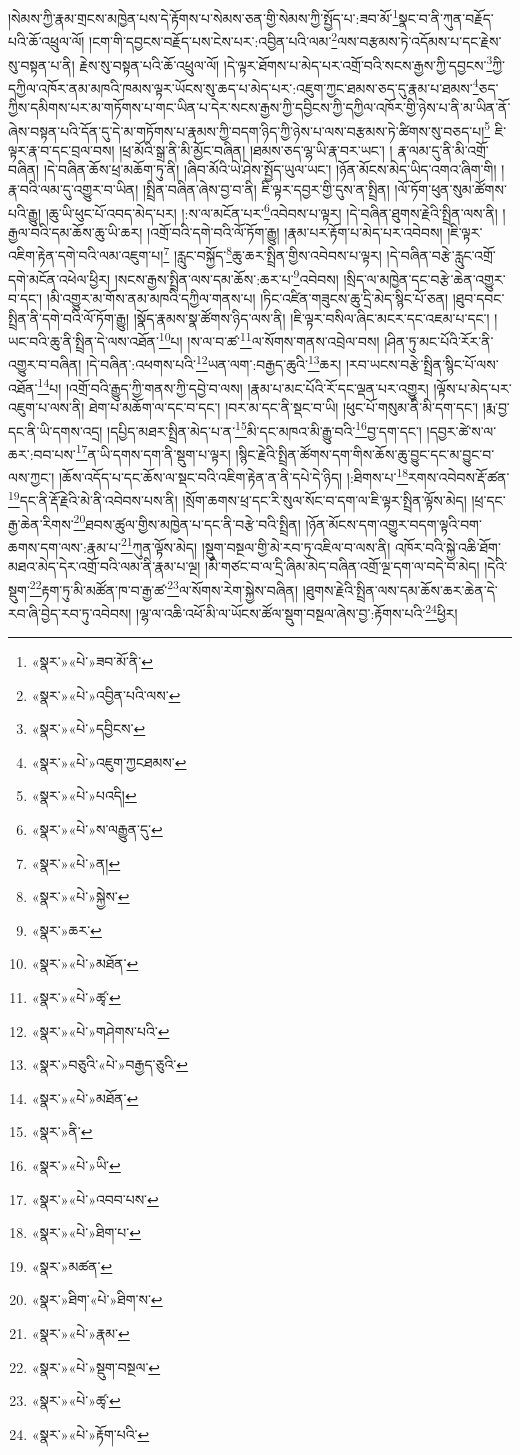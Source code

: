།སེམས་ཀྱི་རྣམ་གྲངས་མཁྱེན་པས་དེ་རྟོགས་པ་སེམས་ཅན་གྱི་སེམས་ཀྱི་སྤྱོད་པ་:ཟབ་མོ་\footnote{«སྣར་»«པེ་»ཟབ་མོ་ནི་}སྣང་བ་ནི་ཀུན་བརྗོད་པའི་ཆོ་འཕྲུལ་ལོ། །ངག་གི་དབྱངས་བརྗོད་པས་ངེས་པར་:འབྱིན་པའི་ལམ་\footnote{«སྣར་»«པེ་»འབྱིན་པའི་ལས་}ལས་བརྩམས་ཏེ་འདོམས་པ་དང་རྗེས་སུ་བསྟན་པ་ནི། རྗེས་སུ་བསྟན་པའི་ཆོ་འཕྲུལ་ལོ། །དེ་ལྟར་ཐོགས་པ་མེད་པར་འགྲོ་བའི་སངས་རྒྱས་ཀྱི་དབྱངས་\footnote{«སྣར་»«པེ་»དབྱིངས་}ཀྱི་དཀྱིལ་འཁོར་ནམ་མཁའི་ཁམས་ལྟར་ཡོངས་སུ་ཆད་པ་མེད་པར་:འཇུག་ཀྱང་ཐམས་ཅད་དུ་རྣམ་པ་ཐམས་\footnote{«སྣར་»«པེ་»འཇུག་ཀྱངཐམས་}ཅད་ཀྱིས་དམིགས་པར་མ་གཏོགས་པ་གང་ཡིན་པ་དེར་སངས་རྒྱས་ཀྱི་དབྱིངས་ཀྱི་དཀྱིལ་འཁོར་གྱི་ཉེས་པ་ནི་མ་ཡིན་ནོ་ཞེས་བསྟན་པའི་དོན་དུ་དེ་མ་གཏོགས་པ་རྣམས་ཀྱི་བདག་ཉིད་ཀྱི་ཉེས་པ་ལས་བརྩམས་ཏེ་ཚིགས་སུ་བཅད་པ།\footnote{«སྣར་»«པེ་»པའདི།} ཇི་ལྟར་རྣ་བ་དང་བྲལ་བས། །ཕྲ་མོའི་སྒྲ་ནི་མི་མྱོང་བཞིན། །ཐམས་ཅད་ལྷ་ཡི་རྣ་བར་ཡང་། །
རྣ་ལམ་དུ་ནི་མི་འགྲོ་བཞིན། །དེ་བཞིན་ཆོས་ཕྲ་མཆོག་ཏུ་ནི། །ཞིབ་མོའི་ཡེ་ཤེས་སྤྱོད་ཡུལ་ཡང་། །ཉོན་མོངས་མེད་ཡིད་འགའ་ཞིག་གི། །རྣ་བའི་ལམ་དུ་འགྱུར་བ་ཡིན། །སྤྲིན་བཞིན་ཞེས་བྱ་བ་ནི། ཇི་ལྟར་དབྱར་གྱི་དུས་ན་སྤྲིན། །ལོ་ཏོག་ཕུན་སུམ་ཚོགས་པའི་རྒྱུ། །ཆུ་ཡི་ཕུང་པོ་འབད་མེད་པར། །:ས་ལ་མངོན་པར་\footnote{«སྣར་»«པེ་»ས་ལརྒྱུན་དུ་}འབེབས་པ་ལྟར། །དེ་བཞིན་ཐུགས་རྗེའི་སྤྲིན་ལས་ནི། །རྒྱལ་བའི་དམ་ཆོས་ཆུ་ཡི་ཆར། །འགྲོ་བའི་དགེ་བའི་ལོ་ཏོག་རྒྱུ། །རྣམ་པར་རྟོག་པ་མེད་པར་འབེབས། །ཇི་ལྟར་འཇིག་རྟེན་དགེ་བའི་ལམ་འཇུག་པ།\footnote{«སྣར་»«པེ་»ན།} །རླུང་བསྐྱོད་\footnote{«སྣར་»«པེ་»སྐྱེས་}ཆུ་ཆར་སྤྲིན་གྱིས་འབེབས་པ་ལྟར། །དེ་བཞིན་བརྩེ་རླུང་འགྲོ་དགེ་མངོན་འཕེལ་ཕྱིར། །སངས་རྒྱས་སྤྲིན་ལས་དམ་ཆོས་:ཆར་པ་\footnote{«སྣར་»ཆར་}འབེབས། །སྲིད་ལ་མཁྱེན་དང་བརྩེ་ཆེན་འགྱུར་བ་དང་། །མི་འགྱུར་མ་གོས་ནམ་མཁའི་དཀྱིལ་གནས་པ། །ཏིང་འཛིན་གཟུངས་ཆུ་དྲི་མེད་སྙིང་པོ་ཅན། །ཐུབ་དབང་སྤྲིན་ནི་དགེ་བའི་ལོ་ཏོག་རྒྱུ། །སྣོད་རྣམས་སྣ་ཚོགས་ཉིད་ལས་ནི། །ཇི་ལྟར་བསིལ་ཞིང་མངར་དང་འཇམ་པ་དང་། །ཡང་བའི་ཆུ་ནི་སྤྲིན་དེ་ལས་འཐོན་\footnote{«སྣར་»«པེ་»མཐོན་}པ། །ས་ལ་བ་ཚ་\footnote{«སྣར་»«པེ་»ཚྭ་}ལ་སོགས་གནས་འབྲེལ་བས། །ཤིན་ཏུ་མང་པོའི་རོར་ནི་འགྱུར་བ་བཞིན། །དེ་བཞིན་:འཕགས་པའི་\footnote{«སྣར་»«པེ་»གཤེགས་པའི་}ཡན་ལག་:བརྒྱད་ཆུའི་\footnote{«སྣར་»བཅུའི་«པེ་»བརྒྱད་ཅུའི་}ཆར། །རབ་ཡངས་བརྩེ་སྤྲིན་སྙིང་པོ་ལས་འཐོན་\footnote{«སྣར་»«པེ་»མཐོན་}པ། །འགྲོ་བའི་རྒྱུད་ཀྱི་གནས་ཀྱི་དབྱེ་བ་ལས། །རྣམ་པ་མང་པོའི་རོ་དང་ལྡན་པར་འགྱུར། །ལྟོས་པ་མེད་པར་འཇུག་པ་ལས་ནི། ཐེག་པ་མཆོག་ལ་དང་བ་དང་། །བར་མ་དང་ནི་སྡང་བ་ཡི། །ཕུང་པོ་གསུམ་ནི་མི་དག་དང་། །རྨ་བྱ་དང་ནི་ཡི་དགས་འདྲ། །དཔྱིད་མཐར་སྤྲིན་མེད་པ་ན་\footnote{«སྣར་»ནི་}མི་དང་མཁའ་མི་རྒྱུ་བའི་\footnote{«སྣར་»«པེ་»ཡི་}བྱ་དག་དང་། །དབྱར་ཚེ་ས་ལ་ཆར་:བབ་པས་\footnote{«སྣར་»«པེ་»འབབ་པས་}ན་ཡི་དགས་དག་ནི་སྡུག་པ་ལྟར། །སྙིང་རྗེའི་སྤྲིན་ཚོགས་དག་གིས་ཆོས་ཆུ་བྱུང་དང་མ་བྱུང་བ་ལས་ཀྱང་། །ཆོས་འདོད་པ་དང་ཆོས་ལ་སྡང་བའི་འཇིག་རྟེན་ན་ནི་དཔེ་དེ་ཉིད། །:ཐིགས་པ་\footnote{«སྣར་»«པེ་»ཐིག་པ་}རགས་འབེབས་རྡོ་ཚན་\footnote{«སྣར་»མཚན་}དང་ནི་རྡོ་རྗེའི་མེ་ནི་འབེབས་པས་ནི། །སྲོག་ཆགས་ཕྲ་དང་རི་སུལ་སོང་བ་དག་ལ་ཇི་ལྟར་སྤྲིན་ལྟོས་མེད། །ཕྲ་དང་རྒྱ་ཆེན་རིགས་\footnote{«སྣར་»ཐིག་«པེ་»ཐིག་ས་}ཐབས་ཚུལ་གྱིས་མཁྱེན་པ་དང་ནི་བརྩེ་བའི་སྤྲིན། །ཉོན་མོངས་དག་འགྱུར་བདག་ལྟའི་བག་ཆགས་དག་ལས་:རྣམ་པ་\footnote{«སྣར་»«པེ་»རྣམ་}ཀུན་ལྟོས་མེད། །སྡུག་བསྔལ་གྱི་མེ་རབ་ཏུ་འཇིལ་བ་ལས་ནི། འཁོར་བའི་སྐྱེ་འཆི་ཐོག་མཐའ་མེད་དེར་འགྲོ་བའི་ལམ་ནི་རྣམ་པ་ལྔ། །མི་གཙང་བ་ལ་དྲི་ཞིམ་མེད་བཞིན་འགྲོ་ལྔ་དག་ལ་བདེ་བ་མེད། །དེའི་སྡུག་\footnote{«སྣར་»«པེ་»སྡུག་བསྔལ་}རྟག་ཏུ་མི་མཚོན་ཁ་བ་རྒྱ་ཚ་\footnote{«སྣར་»«པེ་»ཚྭ་}ལ་སོགས་རེག་སྐྱེས་བཞིན། །ཐུགས་རྗེའི་སྤྲིན་ལས་དམ་ཆོས་ཆར་ཆེན་དེ་རབ་ཞི་བྱེད་རབ་ཏུ་འབེབས། །ལྷ་ལ་འཆི་འཕོ་མི་ལ་ཡོངས་ཚོལ་སྡུག་བསྔལ་ཞེས་བྱ་:རྟོགས་པའི་\footnote{«སྣར་»«པེ་»རྟོག་པའི་}ཕྱིར། 